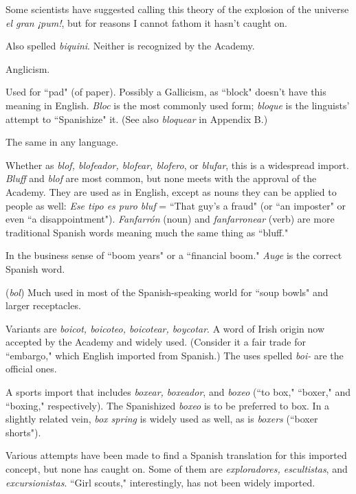  Some scientists have suggested calling this theory
of the explosion of the universe \emph{el gran ¡pum!}, but for reasons I cannot
fathom it hasn't caught on.

 Also spelled \emph{biquini}. Neither is recognized by the
Academy.

 Anglicism.

 Used for ``pad" (of paper). Possibly a Gallicism, as
``block" doesn't have this meaning in English. \emph{Bloc} is the most commonly used form; \emph{bloque} is the linguists' attempt to ``Spanishize" it.
(See also \emph{bloquear} in Appendix B.)

 The same in any language.

 Whether as \emph{blof, blofeador, blofear, blofero}, or \emph{blufar},
this is a widespread import. \emph{Bluff} and \emph{blof} are most common, but none
meets with the approval of the Academy. They are used as in English,
except as nouns they can be applied to people as well: \emph{Ese tipo es puro
	bluf} = ``That guy's a fraud" (or ``an imposter" or even ``a disappointment"). \emph{Fanfarrón} (noun) and \emph{fanfarronear} (verb) are more traditional
Spanish words meaning much the same thing as ``bluff."

 In the business sense of ``boom years" or a ``financial
boom." \emph{Auge} is the correct Spanish word.

 (\emph{bol}) Much used in most of the Spanish-speaking
world for ``soup bowls" and larger receptacles.

 Variants are \emph{boicot, boicoteo, boicotear, boycotar}.
A word of Irish origin now accepted by the Academy and widely used.
(Consider it a fair trade for ``embargo," which English imported from
Spanish.) The uses spelled \emph{boi-} are the official ones.

 A sports import that includes \emph{boxear, boxeador}, and
\emph{boxeo} (``to box," ``boxer," and ``boxing," respectively). The Spanishized
\emph{boxeo} is to be preferred to box. In a slightly related vein, \emph{box spring} is
widely used as well, as is \emph{boxers} (``boxer shorts").

 Various attempts have been made to find a Spanish translation for this imported concept, but none has caught on.
Some of them are \emph{exploradores, escultistas}, and \emph{excursionistas}. ``Girl
scouts," interestingly, has not been widely imported.

